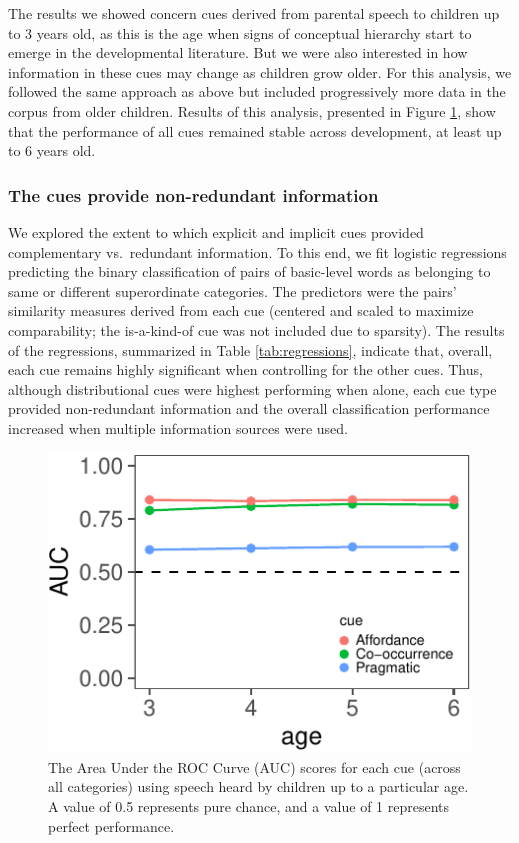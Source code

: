 \documentclass[10pt, letterpaper]{article}
\newenvironment{CodeChunk}{}{}
\begin{document}
The results we showed concern cues derived from parental speech to
children up to 3 years old, as this is the age when signs of conceptual
hierarchy start to emerge in the developmental literature. But we were
also interested in how information in these cues may change as children
grow older. For this analysis, we followed the same approach as above
but included progressively more data in the corpus from older children.
Results of this analysis, presented in Figure \ref{fig:dev}, show that
the performance of all cues remained stable across development, at least
up to 6 years old.

\hypertarget{the-cues-provide-non-redundant-information}{%
\subsubsection{The cues provide non-redundant
information}\label{the-cues-provide-non-redundant-information}}

We explored the extent to which explicit and implicit cues provided
complementary vs.~redundant information. To this end, we fit logistic
regressions predicting the binary classification of pairs of basic-level
words as belonging to same or different superordinate categories. The
predictors were the pairs' similarity measures derived from each cue
(centered and scaled to maximize comparability; the is-a-kind-of cue was
not included due to sparsity). The results of the regressions,
summarized in Table \ref{tab:regressions}, indicate that, overall, each
cue remains highly significant when controlling for the other cues.
Thus, although distributional cues were highest performing when alone,
each cue type provided non-redundant information and the overall
classification performance increased when multiple information sources
were used.

\begin{CodeChunk}
\begin{figure}[h]

{\centering \includegraphics{cogsci_files/figure-latex/dev-1} 

}

\caption{\label{fig:dev} The Area Under the ROC Curve (AUC) scores for each cue (across all categories) using speech heard by children up to a particular age. A value of 0.5 represents pure chance, and a value of 1 represents perfect performance.}\label{fig:dev}
\end{figure}
\end{CodeChunk}
\end{document}
